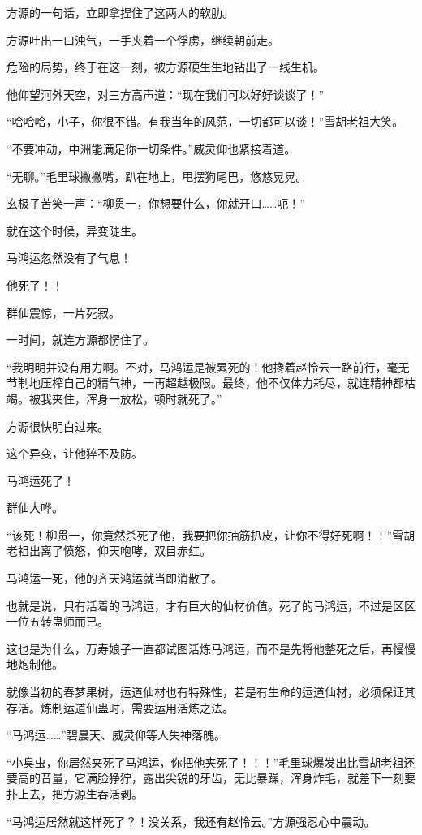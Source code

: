 \begin{this_body}
方源的一句话，立即拿捏住了这两人的软肋。

方源吐出一口浊气，一手夹着一个俘虏，继续朝前走。

危险的局势，终于在这一刻，被方源硬生生地钻出了一线生机。

他仰望河外天空，对三方高声道：“现在我们可以好好谈谈了！”

“哈哈哈，小子，你很不错。有我当年的风范，一切都可以谈！”雪胡老祖大笑。

“不要冲动，中洲能满足你一切条件。”威灵仰也紧接着道。

“无聊。”毛里球撇撇嘴，趴在地上，甩摆狗尾巴，悠悠晃晃。

玄极子苦笑一声：“柳贯一，你想要什么，你就开口……呃！”

就在这个时候，异变陡生。

马鸿运忽然没有了气息！

他死了！！

群仙震惊，一片死寂。

一时间，就连方源都愣住了。

“我明明并没有用力啊。不对，马鸿运是被累死的！他搀着赵怜云一路前行，毫无节制地压榨自己的精气神，一再超越极限。最终，他不仅体力耗尽，就连精神都枯竭。被我夹住，浑身一放松，顿时就死了。”

方源很快明白过来。

这个异变，让他猝不及防。

马鸿运死了！

群仙大哗。

“该死！柳贯一，你竟然杀死了他，我要把你抽筋扒皮，让你不得好死啊！！”雪胡老祖出离了愤怒，仰天咆哮，双目赤红。

马鸿运一死，他的齐天鸿运就当即消散了。

也就是说，只有活着的马鸿运，才有巨大的仙材价值。死了的马鸿运，不过是区区一位五转蛊师而已。

这也是为什么，万寿娘子一直都试图活炼马鸿运，而不是先将他整死之后，再慢慢地炮制他。

就像当初的春梦果树，运道仙材也有特殊性，若是有生命的运道仙材，必须保证其存活。炼制运道仙蛊时，需要运用活炼之法。

“马鸿运……”碧晨天、威灵仰等人失神落魄。

“小臭虫，你居然夹死了马鸿运，你把他夹死了！！！”毛里球爆发出比雪胡老祖还要高的音量，它满脸狰狞，露出尖锐的牙齿，无比暴躁，浑身炸毛，就差下一刻要扑上去，把方源生吞活剥。

“马鸿运居然就这样死了？！没关系，我还有赵怜云。”方源强忍心中震动。


\end{this_body}
